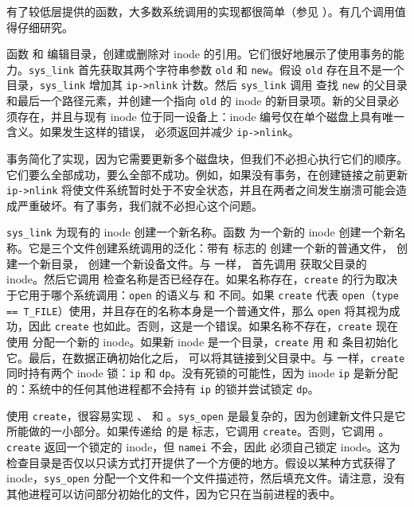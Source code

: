 有了较低层提供的函数，大多数系统调用的实现都很简单（参见 ）。有几个调用值得仔细研究。

函数  和  编辑目录，创建或删除对 inode 的引用。它们很好地展示了使用事务的能力。\lstinline{sys_link} 首先获取其两个字符串参数 \lstinline{old} 和 \lstinline{new}。假设 \lstinline{old} 存在且不是一个目录，\lstinline{sys_link} 增加其 \lstinline{ip->nlink} 计数。然后 \lstinline{sys_link} 调用  查找 \lstinline{new} 的父目录和最后一个路径元素，并创建一个指向 \lstinline{old} 的 inode 的新目录项。新的父目录必须存在，并且与现有 inode 位于同一设备上：inode 编号仅在单个磁盘上具有唯一含义。如果发生这样的错误， 必须返回并减少 \lstinline{ip->nlink}。

事务简化了实现，因为它需要更新多个磁盘块，但我们不必担心执行它们的顺序。它们要么全部成功，要么全部不成功。例如，如果没有事务，在创建链接之前更新 \lstinline{ip->nlink} 将使文件系统暂时处于不安全状态，并且在两者之间发生崩溃可能会造成严重破坏。有了事务，我们就不必担心这个问题。

\lstinline{sys_link} 为现有的 inode 创建一个新名称。函数  为一个新的 inode 创建一个新名称。它是三个文件创建系统调用的泛化：带有  标志的  创建一个新的普通文件， 创建一个新目录， 创建一个新设备文件。与  一样， 首先调用  获取父目录的 inode。然后它调用  检查名称是否已经存在。如果名称存在，\lstinline{create} 的行为取决于它用于哪个系统调用：\lstinline{open} 的语义与  和  不同。如果 \lstinline{create} 代表 \lstinline{open}（\lstinline{type == T_FILE}）使用，并且存在的名称本身是一个普通文件，那么 \lstinline{open} 将其视为成功，因此 \lstinline{create} 也如此。否则，这是一个错误。如果名称不存在，\lstinline{create} 现在使用  分配一个新的 inode。如果新 inode 是一个目录，\lstinline{create} 用  和  条目初始化它。最后，在数据正确初始化之后， 可以将其链接到父目录中。与  一样，\lstinline{create} 同时持有两个 inode 锁：\lstinline{ip} 和 \lstinline{dp}。没有死锁的可能性，因为 inode \lstinline{ip} 是新分配的：系统中的任何其他进程都不会持有 \lstinline{ip} 的锁并尝试锁定 \lstinline{dp}。

使用 \lstinline{create}，很容易实现 、 和 。\lstinline{sys_open} 是最复杂的，因为创建新文件只是它所能做的一小部分。如果传递给  的是  标志，它调用 \lstinline{create}。否则，它调用 。\lstinline{create} 返回一个锁定的 inode，但 \lstinline{namei} 不会，因此  必须自己锁定 inode。这为检查目录是否仅以只读方式打开提供了一个方便的地方。假设以某种方式获得了 inode，\lstinline{sys_open} 分配一个文件和一个文件描述符，然后填充文件。请注意，没有其他进程可以访问部分初始化的文件，因为它只在当前进程的表中。

